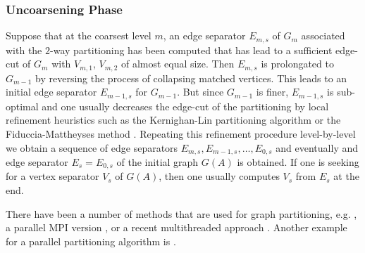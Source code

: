 \subsubsection*{Uncoarsening Phase}
Suppose that at the coarsest level $m$, an edge separator $E_{m,s}$ 
of $G_m$ associated with the  $2$-way partitioning has been computed 
that has lead to a sufficient edge-cut of $G_m$ with $V_{m,1}$, $V_{m,2}$
of almost equal size.
Then $E_{m,s}$ is prolongated to $G_{m-1}$ by reversing the process of
collapsing matched vertices. This leads to an initial edge separator
$E_{m-1,s}$ for $G_{m-1}$. But since $G_{m-1}$ is finer, $E_{m-1,s}$ is 
sub-optimal and one usually decreases the edge-cut of the partitioning
by local refinement heuristics such as the
Kernighan-Lin partitioning algorithm \cite{KerL70} 
or the Fiduccia-Mattheyses method \cite{FidM97}.
Repeating this refinement procedure level-by-level we obtain a sequence
of edge separators $E_{m,s},E_{m-1,s},\dots,E_{0,s}$ and eventually and
edge separator $E_{s}=E_{0,s}$ of the initial graph $G(A)$ is obtained.
If one is seeking for a vertex separator $V_s$ of $G(A)$, then one usually 
computes $V_s$ from $E_s$ at the end.

There have been a number of methods that are used for graph partitioning,
e.g. \metis{} \cite{karypis:98}, a parallel MPI version \parmetis{} \cite{KarSK99},
or a recent multithreaded approach \mtmetis \cite{LasK13}.
Another example for a parallel partitioning algorithm is \scotch \cite{CheP08}. 

